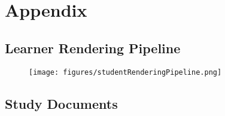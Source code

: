 \chapter{Appendix}

\section{Learner Rendering Pipeline}
\label{a:studentRenderingPipeline}
\begin{figure}[H]
	\texttt{[image: figures/studentRenderingPipeline.png]}
\end{figure}
\newpage

\section{Study Documents}











